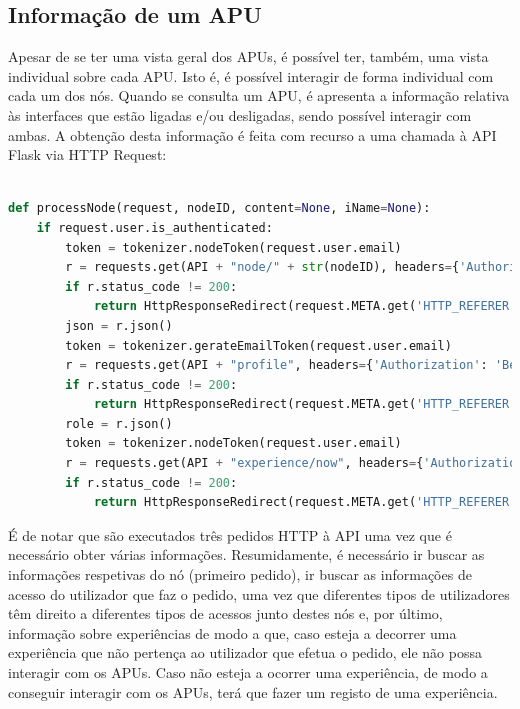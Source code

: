 \subsection{Informação de um APU}
Apesar de se ter uma vista geral dos APUs, é possível ter, também, uma vista individual sobre cada APU. Isto é, é possível interagir de forma individual com cada um dos nós. Quando se consulta um APU, é apresenta a informação relativa às interfaces que estão ligadas e/ou desligadas, sendo possível interagir com ambas.
A obtenção desta informação é feita com recurso a uma chamada à API Flask via HTTP Request:
\begin{lstlisting}[language=python,caption={Pedido de informação de um APU},breaklines=true,label={code:apuinfo}]

def processNode(request, nodeID, content=None, iName=None):
    if request.user.is_authenticated:
        token = tokenizer.nodeToken(request.user.email)
        r = requests.get(API + "node/" + str(nodeID), headers={'Authorization': 'Bearer ' + token})
        if r.status_code != 200:
            return HttpResponseRedirect(request.META.get('HTTP_REFERER', '/'))
        json = r.json()
        token = tokenizer.gerateEmailToken(request.user.email)
        r = requests.get(API + "profile", headers={'Authorization': 'Bearer ' + token})
        if r.status_code != 200:
            return HttpResponseRedirect(request.META.get('HTTP_REFERER', '/'))
        role = r.json()
        token = tokenizer.nodeToken(request.user.email)
        r = requests.get(API + "experience/now", headers={'Authorization': 'Bearer ' + token})
        if r.status_code != 200:
            return HttpResponseRedirect(request.META.get('HTTP_REFERER', '/'))
\end{lstlisting}
\hfill\break
É de notar que são executados três pedidos HTTP à API uma vez que é necessário obter várias informações. Resumidamente, é necessário ir buscar as informações respetivas do nó (primeiro pedido), ir buscar as informações de acesso do utilizador que faz o pedido, uma vez que diferentes tipos de utilizadores têm direito a diferentes tipos de acessos junto destes nós e, por último, informação sobre experiências de modo a que, caso esteja a decorrer uma experiência que não pertença ao utilizador que efetua o pedido, ele não possa interagir com os APUs. Caso não esteja a ocorrer uma experiência, de modo a conseguir interagir com os APUs, terá que fazer um registo de uma experiência.\hfill\break
\newpage
